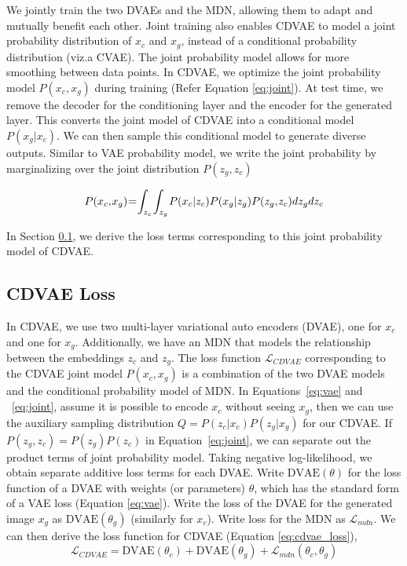\documentclass[10pt,twocolumn,letterpaper]{article}
\begin{document}
We jointly train the two DVAEs and the MDN, allowing them to adapt and mutually benefit each 
other. Joint training also enables CDVAE to model a joint probability distribution
of $x_c$ and $x_g$, instead of a conditional probability distribution (viz.\like a 
CVAE). The joint probability model allows for more smoothing between data points. 
In CDVAE, we optimize the joint probability model $P(x_c, x_g)$ during training 
(Refer Equation \ref{eq:joint}). At test time, we remove the decoder for the 
conditioning layer and the encoder for the generated layer. This converts the 
joint model of CDVAE into a conditional model $P(x_g|x_c)$. We can then sample this 
conditional model to generate diverse outputs. Similar to VAE probability model, 
we write the joint probability by marginalizing over the joint distribution $P(z_g, z_c)$

\begin{equation}
\medmuskip=1mu
\thinmuskip=1mu
\thickmuskip=1mu
P(x_c, x_g)  = \int_{z_c} \int_{z_g} P(x_c|z_c) P(x_g|z_g)  P(z_g, z_c) dz_g dz_c
\label{eq:joint}
\end{equation}


In Section \ref{sec:mdn}, we derive the loss terms corresponding to this joint 
probability model of CDVAE. 



\subsection{CDVAE Loss}
\label{sec:mdn}

In CDVAE, we use two multi-layer variational auto encoders (DVAE), one for $x_c$ and one 
for $x_g$. Additionally, we have an MDN that models the relationship between the embeddings
$z_c$ and $z_g$. The loss function $\mathcal{L}_{CDVAE}$ corresponding to the CDVAE joint model $P(x_{c}, x_{g})$ 
is a combination of the two DVAE models and the conditional probability model of MDN. 
In Equations~\ref{eq:vae} and ~\ref{eq:joint}, 
assume it is possible to encode $x_c$ without seeing $x_g$, then we can use the auxiliary 
sampling distribution $Q=P(z_c|x_c)P(z_g|x_g)$ for our CDVAE. If $P(z_g, z_c)=P(z_g) P(z_c)$ 
in Equation~\ref{eq:joint}, we can separate out the product terms of joint probability 
model. Taking negative log-likelihood, we obtain separate additive loss terms for each 
DVAE. Write $\mbox{DVAE}(\theta)$ for the loss function of a DVAE with weights
(or parameters) $\theta$, which has the standard form of a VAE loss (Equation \ref{eq:vae}). 
Write the loss of the DVAE for the generated image $x_g$ as $\mbox{DVAE}(\theta_g)$ 
(similarly for $x_c$). Write loss for the MDN as $\mathcal{L}_{mdn}$. We can then derive the 
loss function for CDVAE (Equation \ref{eq:cdvae_loss}), 
\begin{equation}
\mathcal{L}_{CDVAE} =  \mbox{DVAE}(\theta_c) + \mbox{DVAE}(\theta_g) + \mathcal{L}_{mdn}(\theta_c, \theta_g)
\label{eq:cdvae_loss}
\end{equation}
\end{document}
